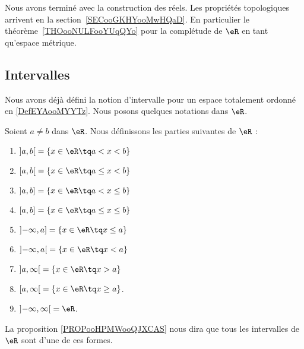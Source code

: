 Nous avons terminé avec la construction des réels. Les propriétés topologiques arrivent en la section~\ref{SECooGKHYooMwHQaD}. En particulier le théorème~\ref{THOooNULFooYUqQYo} pour la complétude de \( \eR\) en tant qu'espace métrique.

\subsection{Intervalles}

Nous avons déjà défini la notion d'intervalle pour un espace totalement ordonné en \ref{DefEYAooMYYTz}. Nous posons quelques notations dans \( \eR\).

\begin{definition}  \label{DEFooAQBUooKLChOW}
	Soient \( a\neq b\) dans \( \eR\). Nous définissons les parties suivantes de \( \eR\) :
	\begin{enumerate}
		\item
		      \( \mathopen] a , b \mathclose[=\{ x\in \eR\tq a<x<b \}\)
		\item
		      \( \mathopen[ a , b \mathclose[=\{ x\in \eR\tq a\leq x<b \}\)
		\item
		      \( \mathopen] a , b \mathclose]=\{ x\in \eR\tq a<x\leq b \}\)
		\item
		      \( \mathopen[ a , b \mathclose]=\{ x\in \eR\tq a\leq x\leq b \}\)
		\item
		      \( \mathopen]-\infty , a \mathclose]=\{ x\in \eR\tq x\leq a \}\)
		\item
		      \( \mathopen]-\infty , a \mathclose[=\{ x\in \eR\tq x< a \}\)
		\item
		      \( \mathopen] a , \infty \mathclose[=\{ x\in \eR\tq x>a \}\)
		\item
		      \( \mathopen[ a , \infty \mathclose[=\{ x\in \eR\tq x\geq a \}\).
		\item
		      \( \mathopen] -\infty , \infty \mathclose[=\eR\).
	\end{enumerate}
	La proposition \ref{PROPooHPMWooQJXCAS} nous dira que tous les intervalles de \( \eR\) sont d'une de ces formes.
\end{definition}

